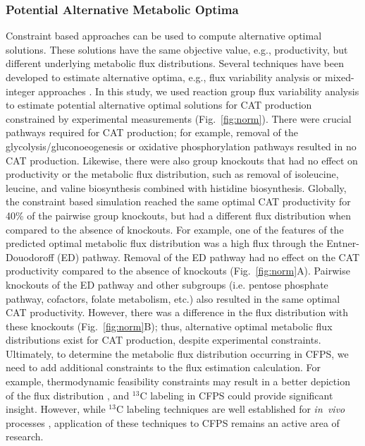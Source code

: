 \documentclass[journal=asbcd6,manuscript=article]{achemso}
\begin{document}
\subsubsection{Potential Alternative Metabolic Optima}
Constraint based approaches can be used to compute alternative optimal solutions.
These solutions have the same objective value, e.g., productivity, but different underlying metabolic flux distributions.
Several techniques have been developed to estimate alternative optima, e.g., flux variability analysis \cite{Mahadevan2003264,Schuetz119} or mixed-integer approaches \cite{LEE2000711}.
In this study, we used reaction group flux variability analysis to estimate potential alternative optimal solutions for CAT production constrained by experimental measurements (Fig.~\ref{fig:norm}).
There were crucial pathways required for CAT production; for example, removal of the glycolysis/gluconoeogenesis or oxidative phosphorylation pathways resulted in no CAT production.
Likewise, there were also group knockouts that had no effect on productivity or the metabolic flux distribution, such as removal of isoleucine, leucine, and valine biosynthesis combined with histidine biosynthesis.
Globally, the constraint based simulation reached the same optimal CAT productivity for 40\% of the pairwise group knockouts, but had a different flux distribution when compared to the absence of knockouts.
For example, one of the features of the predicted optimal metabolic flux distribution was a high flux through the Entner-Douodoroff (ED) pathway.
Removal of the ED pathway had no effect on the CAT productivity compared to the absence of knockouts (Fig.~\ref{fig:norm}A).
Pairwise knockouts of the ED pathway and other subgroups (i.e. pentose phosphate pathway, cofactors, folate metabolism, etc.) also resulted in the same optimal CAT productivity.
However, there was a difference in the flux distribution with these knockouts (Fig.~\ref{fig:norm}B); thus, alternative optimal metabolic flux distributions exist for CAT production, despite experimental constraints.
Ultimately, to determine the metabolic flux distribution occurring in CFPS, we need to add additional constraints to the flux estimation calculation.
For example, thermodynamic feasibility constraints may result in a better depiction of the flux distribution \cite{Henry:2007,Hamilton:2013},
and $^{13}$C labeling in CFPS could provide significant insight.
However, while $^{13}$C labeling techniques are well established for \emph{in~vivo} processes \cite{Zamboni:2009},
application of these techniques to CFPS remains an active area of research.
\end{document}
